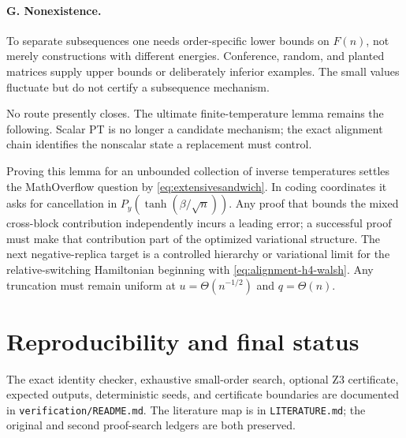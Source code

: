 \documentclass[11pt]{article}
\begin{document}
\paragraph{G. Nonexistence.}
To separate subsequences one needs order-specific lower bounds on \(F(n)\),
not merely constructions with different energies.  Conference, random, and
planted matrices supply upper bounds or deliberately inferior examples.  The
small values fluctuate but do not certify a subsequence mechanism.

No route presently closes.  The ultimate finite-temperature lemma remains the
following.  Scalar PT is no longer a candidate mechanism; the exact alignment
chain identifies the nonscalar state a replacement must control.

\begin{center}
\end{center}

Proving this lemma for an unbounded collection of inverse temperatures settles
the MathOverflow question by \eqref{eq:extensivesandwich}.  In coding
coordinates it asks for cancellation in
\(P_y(\tanh(\beta/\sqrt n))\).  Any proof that bounds the mixed cross-block
contribution independently incurs a leading error; a successful proof must
make that contribution part of the optimized variational structure.  The next
negative-replica target is a controlled hierarchy or variational limit for the
relative-switching Hamiltonian beginning with
\eqref{eq:alignment-h4-walsh}.  Any truncation must remain uniform at
$u=\Theta(n^{-1/2})$ and $q=\Theta(n)$.

\section*{Reproducibility and final status}

The exact identity checker, exhaustive small-order search, optional Z3
certificate, expected outputs, deterministic seeds, and certificate boundaries
are documented in \texttt{verification/README.md}.  The literature map is in
\texttt{LITERATURE.md}; the original and second proof-search ledgers are both
preserved.
\end{document}
